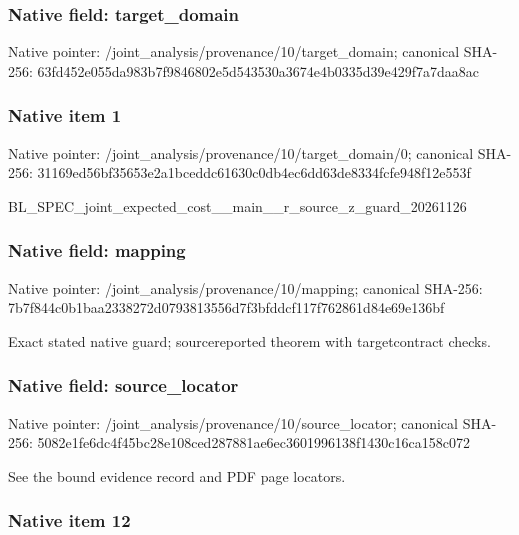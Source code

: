 \documentclass[10pt,a4paper]{article}
\begin{document}
\subsubsection{Native field: target\_domain}


Native pointer: /joint\_analysis/provenan\allowbreak{}ce/10/target\_domain; canonical SHA-256: 63fd452e055da983b7f98468\allowbreak{}02e5d543530a3674e4b0335d\allowbreak{}39e429f7a7daa8ac



\subsubsection{Native item 1}


Native pointer: /joint\_analysis/provenan\allowbreak{}ce/10/target\_domain/0; canonical SHA-256: 31169ed56bf35653e2a1bced\allowbreak{}dc61630c0db4ec6dd63de833\allowbreak{}4fcfe948f12e553f


BL\_SPEC\_joint\_expected\_c\allowbreak{}ost\_\_main\_\_r\_source\_z\_gu\allowbreak{}ard\_20261126


\subsubsection{Native field: mapping}


Native pointer: /joint\_analysis/provenance/10/mapping; canonical SHA-256: 7b7f844c0b1baa2338272d07\allowbreak{}93813556d7f3bfddcf117f76\allowbreak{}2861d84e69e136bf


Exact stated native guard; sourcereported theorem with targetcontract checks.


\subsubsection{Native field: source\_locator}


Native pointer: /joint\_analysis/provenan\allowbreak{}ce/10/source\_locator; canonical SHA-256: 5082e1fe6dc4f45bc28e108c\allowbreak{}ed287881ae6ec3601996138f\allowbreak{}1430c16ca158c072


See the bound evidence record and PDF page locators.


\subsubsection{Native item 12}
\end{document}

